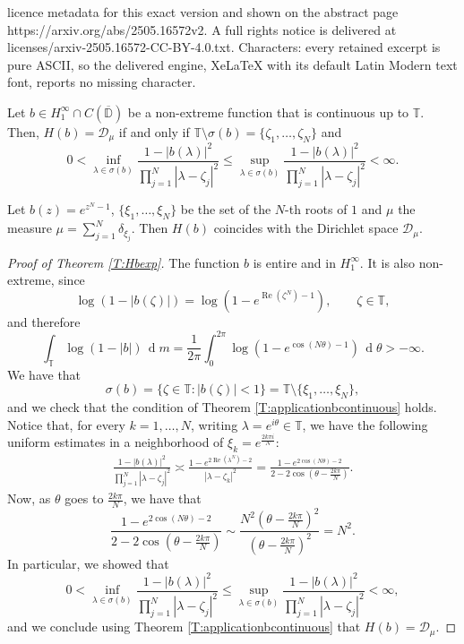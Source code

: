 \documentclass[10pt,a4paper]{amsart}
\begin{document}
licence metadata for this exact version and shown on the abstract page https://arxiv.org/abs/2505.16572v2. A full rights notice is delivered at licenses/arxiv-2505.16572-CC-BY-4.0.txt. Characters: every retained excerpt is pure ASCII, so the delivered engine, XeLaTeX with its default Latin Modern text font, reports no missing character.
\begin{theorem} \label{T:applicationbcontinuous}
    Let $b\in H^\infty_1\cap C(\overline{\mathbb{D}})$ be a non-extreme function that is continuous up to $\mathbb{T}$. Then, $H(b)=\mathcal{D}_\mu$ if and only if $\mathbb{T}\setminus\sigma(b)=\{\zeta_1,\ldots,\zeta_N\}$ and 
    \[0<\inf_{\lambda\in\sigma(b)}\frac{1-|b(\lambda)|^2}{\prod_{j=1}^N|\lambda-\zeta_j|^2}\leq \sup_{\lambda\in\sigma(b)}\frac{1-|b(\lambda)|^2}{\prod_{j=1}^N|\lambda-\zeta_j|^2} <\infty.\]
\end{theorem}

\begin{theorem} \label{T:Hbexp}
    Let $b(z)=e^{z^N-1}$, $\{\xi_1,\ldots,\xi_N\}$ be the set of the $N$-th roots of $1$ and $\mu$ the measure
    $\mu=\sum_{j=1}^N \delta_{\xi_j}.$ Then $H(b)$ coincides with the Dirichlet space $\mathcal{D}_\mu$.
\end{theorem}

\begin{proof}[Proof of Theorem \ref{T:Hbexp}]
    The function $b$ is entire and in $H^\infty_1$. It is also non-extreme, since
    \[\log(1-|b(\zeta)|)=\log(1-e^{\operatorname{Re}(\zeta^N)-1}), \qquad \zeta\in\mathbb{T},\]
    and therefore
    \[\int_{\mathbb{T}}\log(1-|b|)\,\operatorname{d}\!m=\frac{1}{2\pi} \int_0^{2\pi}\log(1-e^{\cos(N\theta)-1})\,\operatorname{d}\!\theta>-\infty.\]
    We have that 
    \[\sigma(b)=\{\zeta\in\mathbb{T}\colon |b(\zeta)|<1\}=\mathbb{T}\setminus\{\xi_1,\ldots,\xi_N\},\]
and we check that the condition of Theorem \ref{T:applicationbcontinuous} holds. Notice that, for every $k=1,\ldots,N$, writing $\lambda=e^{i\theta}\in\mathbb{T}$, we have the following uniform estimates in a neighborhood of $\xi_k=e^{\frac{2k\pi i}{N}}$:
    \begin{align*}
       \frac{1-|b(\lambda)|^2}{\prod_{j=1}^N|\lambda-\zeta_j|^2}\asymp \frac{1-e^{2\operatorname{Re}(\lambda^N)-2}}{|\lambda-\zeta_k|^2}=\frac{1-e^{2\cos(N\theta)-2}}{2-2\cos(\theta-\frac{2k\pi}{N})}.
    \end{align*}
    Now, as $\theta$ goes to $\frac{2k\pi}{N}$, we have that
    \[\frac{1-e^{2\cos(N\theta)-2}}{2-2\cos(\theta-\frac{2k\pi}{N})} \sim \frac{N^2(\theta-\frac{2k\pi}{N})^2}{(\theta-\frac{2k\pi}{N})^2}=N^2.\]
    In particular, we showed that
   \[0<\inf_{\lambda\in\sigma(b)}\frac{1-|b(\lambda)|^2}{\prod_{j=1}^N|\lambda-\zeta_j|^2}\leq \sup_{\lambda\in\sigma(b)}\frac{1-|b(\lambda)|^2}{\prod_{j=1}^N|\lambda-\zeta_j|^2} <\infty,\]
   and we conclude using Theorem \ref{T:applicationbcontinuous} that $H(b)=\mathcal{D}_\mu.$
\end{proof}
\end{document}
